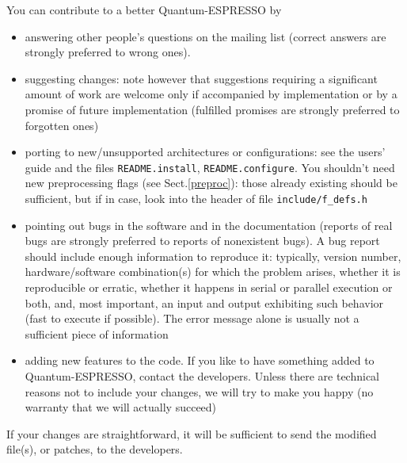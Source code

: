 \documentclass[12pt,a4paper]{article}
\begin{document}
You can contribute to a better Quantum-ESPRESSO by
\begin{itemize}
\item answering other people's questions on the mailing list
  (correct answers are strongly preferred to wrong ones).
\item 
  suggesting changes: note however that suggestions requiring a
  significant amount of work are welcome only if accompanied by
  implementation or by a promise of future implementation
  (fulfilled promises are strongly preferred to forgotten ones)
\item 
  porting to new/unsupported architectures or configurations:
  see the users' guide and the files \texttt{README.install}, 
  \texttt{README.configure}.
  You shouldn't need new preprocessing flags (see Sect.\ref{preproc}):
  those already existing should be sufficient, but if in case, 
  look into the header of file \texttt{include/f\_defs.h}
\item
  pointing out bugs in the software and in the documentation
  (reports of real bugs are strongly preferred to reports of
  nonexistent bugs). A bug report should include enough information
  to reproduce it: typically, version number, hardware/software
  combination(s) for which the problem arises, whether it is 
  reproducible or erratic, whether it happens in serial or parallel 
  execution or both, and, most important, an input and output 
  exhibiting such behavior (fast to execute if possible). The error
  message alone is usually not a sufficient piece of information
\item
  adding new features to the code. If you like to have something added
  to Quantum-ESPRESSO, contact the developers.
  Unless there are technical reasons not to include your changes,
  we will try to make you happy (no warranty that we will actually succeed)
\end{itemize}
  If your changes are straightforward, it will be sufficient to send 
  the modified file(s), or patches, to the developers.
\end{document}
